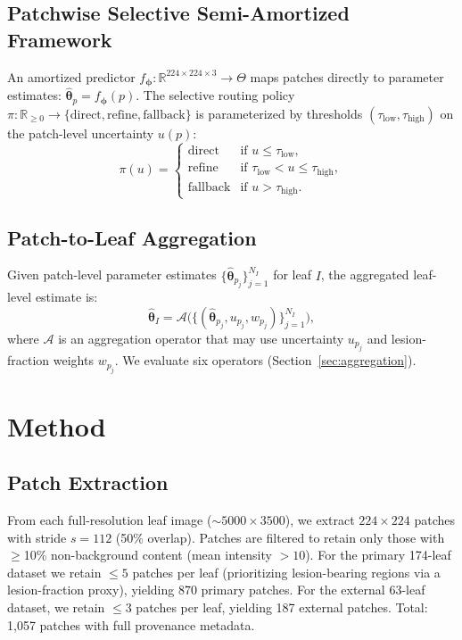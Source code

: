 \documentclass[11pt,a4paper]{article}
\newcommand{\btheta}{\boldsymbol{\theta}}
\newcommand{\bphi}{\boldsymbol{\phi}}
\newcommand{\cA}{\mathcal{A}}
\newcommand{\Real}{\mathbb{R}}
\begin{document}
\subsection{Patchwise Selective Semi-Amortized Framework}

An amortized predictor $f_{\bphi}: \Real^{224 \times 224 \times 3} \to \Theta$ maps
patches directly to parameter estimates:
$\hat{\btheta}_p = f_{\bphi}(p)$.
The selective routing policy $\pi: \Real_{\geq 0} \to \{\text{direct}, \text{refine}, \text{fallback}\}$
is parameterized by thresholds $(\tau_\text{low}, \tau_\text{high})$ on the
patch-level uncertainty $u(p)$:
\begin{equation}
\pi(u) = \begin{cases}
\text{direct} & \text{if } u \leq \tau_\text{low}, \\
\text{refine} & \text{if } \tau_\text{low} < u \leq \tau_\text{high}, \\
\text{fallback} & \text{if } u > \tau_\text{high}.
\end{cases}
\label{eq:routing}
\end{equation}

\subsection{Patch-to-Leaf Aggregation}

Given patch-level parameter estimates $\{\hat{\btheta}_{p_j}\}_{j=1}^{N_I}$
for leaf $I$, the aggregated leaf-level estimate is:
\begin{equation}
\hat{\btheta}_I = \cA\bigl(\{(\hat{\btheta}_{p_j}, u_{p_j}, w_{p_j})\}_{j=1}^{N_I}\bigr),
\label{eq:aggregation}
\end{equation}
where $\cA$ is an aggregation operator that may use uncertainty $u_{p_j}$
and lesion-fraction weights $w_{p_j}$. We evaluate six operators
(Section~\ref{sec:aggregation}).

\section{Method}
\label{sec:method}

\subsection{Patch Extraction}

From each full-resolution leaf image (${\sim}5000{\times}3500$),
we extract $224{\times}224$ patches with stride $s{=}112$
(50\% overlap). Patches are filtered to retain only those with
$\geq$10\% non-background content (mean intensity $> 10$).
For the primary 174-leaf dataset we retain $\leq 5$ patches per leaf
(prioritizing lesion-bearing regions via a lesion-fraction proxy),
yielding 870 primary patches. For the external 63-leaf dataset,
we retain $\leq 3$ patches per leaf, yielding 187 external patches.
Total: 1{,}057 patches with full provenance metadata.
\end{document}
